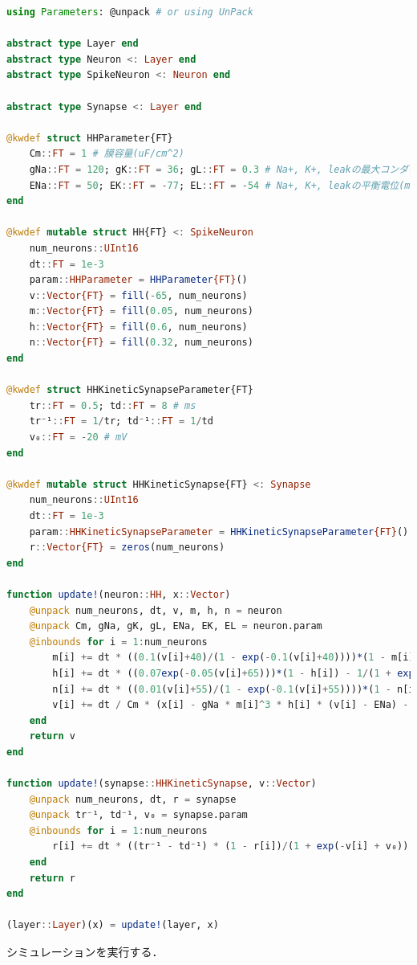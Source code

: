\begin{lstlisting}[language=julia]
using Parameters: @unpack # or using UnPack

abstract type Layer end
abstract type Neuron <: Layer end
abstract type SpikeNeuron <: Neuron end

abstract type Synapse <: Layer end

@kwdef struct HHParameter{FT}
    Cm::FT = 1 # 膜容量(uF/cm^2)
    gNa::FT = 120; gK::FT = 36; gL::FT = 0.3 # Na+, K+, leakの最大コンダクタンス(mS/cm^2)
    ENa::FT = 50; EK::FT = -77; EL::FT = -54 # Na+, K+, leakの平衡電位(mV)
end

@kwdef mutable struct HH{FT} <: SpikeNeuron
    num_neurons::UInt16
    dt::FT = 1e-3
    param::HHParameter = HHParameter{FT}()
    v::Vector{FT} = fill(-65, num_neurons)
    m::Vector{FT} = fill(0.05, num_neurons) 
    h::Vector{FT} = fill(0.6, num_neurons)
    n::Vector{FT} = fill(0.32, num_neurons)
end

@kwdef struct HHKineticSynapseParameter{FT}
    tr::FT = 0.5; td::FT = 8 # ms
    tr⁻¹::FT = 1/tr; td⁻¹::FT = 1/td
    v₀::FT = -20 # mV
end

@kwdef mutable struct HHKineticSynapse{FT} <: Synapse
    num_neurons::UInt16
    dt::FT = 1e-3
    param::HHKineticSynapseParameter = HHKineticSynapseParameter{FT}()
    r::Vector{FT} = zeros(num_neurons)
end

function update!(neuron::HH, x::Vector)
    @unpack num_neurons, dt, v, m, h, n = neuron
    @unpack Cm, gNa, gK, gL, ENa, EK, EL = neuron.param
    @inbounds for i = 1:num_neurons
        m[i] += dt * ((0.1(v[i]+40)/(1 - exp(-0.1(v[i]+40))))*(1 - m[i]) - 4exp(-(v[i]+65) / 18)*m[i])
        h[i] += dt * ((0.07exp(-0.05(v[i]+65)))*(1 - h[i]) - 1/(1 + exp(-0.1(v[i]+35)))*h[i])
        n[i] += dt * ((0.01(v[i]+55)/(1 - exp(-0.1(v[i]+55))))*(1 - n[i]) - (0.125exp(-0.0125(v[i]+65)))*n[i])
        v[i] += dt / Cm * (x[i] - gNa * m[i]^3 * h[i] * (v[i] - ENa) - gK * n[i]^4 * (v[i] - EK) - gL * (v[i] - EL))
    end
    return v
end

function update!(synapse::HHKineticSynapse, v::Vector)
    @unpack num_neurons, dt, r = synapse
    @unpack tr⁻¹, td⁻¹, v₀ = synapse.param    
    @inbounds for i = 1:num_neurons
        r[i] += dt * ((tr⁻¹ - td⁻¹) * (1 - r[i])/(1 + exp(-v[i] + v₀)) - r[i] * td⁻¹)
    end
    return r
end

(layer::Layer)(x) = update!(layer, x)
\end{lstlisting}
シミュレーションを実行する．
